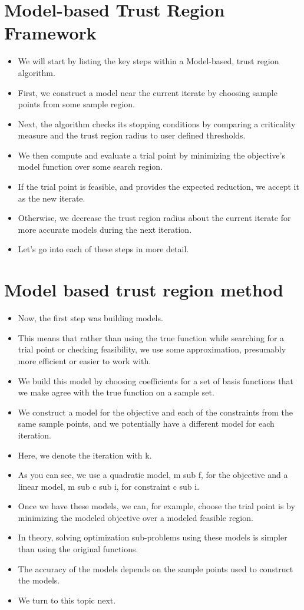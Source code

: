 \documentclass{article}
\begin{document}
	\section{Model-based Trust Region Framework}
\begin{itemize}
\item We will start by listing the key steps within a Model-based, trust region algorithm.
\item First, we construct a model near the current iterate by choosing sample points from some sample region.
\item Next, the algorithm checks its stopping conditions by comparing a criticality measure and the trust region radius to user defined thresholds.
\item We then compute and evaluate a trial point by minimizing the objective's model function over some search region.
\item If the trial point is feasible, and provides the expected reduction, we accept it as the new iterate.
\item Otherwise, we decrease the trust region radius about the current iterate for more accurate models during the next iteration.
\item Let's go into each of these steps in more detail.
\end{itemize}

	\section{Model based trust region method}
\begin{itemize}
\item Now, the first step was building models.
\item This means that rather than using the true function while searching for a trial point or checking feasibility, we use some approximation, presumably more efficient or easier to work with.
\item We build this model by choosing coefficients for a set of basis functions that we make agree with the true function on a sample set.
\item We construct a model for the objective and each of the constraints from the same sample points, and we potentially have a different model for each iteration.
\item Here, we denote the iteration with k.
\item As you can see, we use a quadratic model, m sub f, for the objective and a linear model, m sub c sub i, for constraint c sub i.
\item Once we have these models, we can, for example, choose the trial point is by minimizing the modeled objective over a modeled feasible region.
\item In theory, solving optimization sub-problems using these models is simpler than using the original functions.
\item The accuracy of the models depends on the sample points used to construct the models.
\item We turn to this topic next.
\end{itemize}
\end{document}
